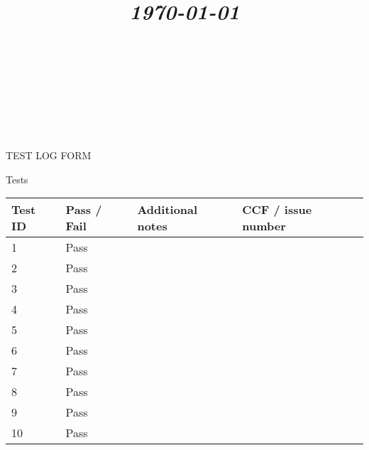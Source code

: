 \documentclass{article}
\title{
	\vspace{1.2in}
	\textmd{\textbf{\doctitle}} \\
	\vspace{0.1in}\large{\textit{\today}} \\
	\vspace{0.4in}
	{\bf{\qanumber}} \\ \vspace{0.4in} %
	\version \\
	\status \\
	\vspace{0.4in}
}
\author{\authors}
\date{}
\begin{document}
	\maketitle
	\newpage
	\tableofcontents
	\newpage

	\begin{section}{TEST LOG FORM}
		\begin{subsection}{Tests}
			\begin{tabularx}{\linewidth}{| p{1.5cm} | p{2cm} | p{9cm} | X |}
				\hline
				\bf{Test ID} & \bf{Pass / Fail} & \bf{Additional notes} & \bf{CCF / issue number} \\
				\hline
1
&
Pass
&

&

\\
\hline

2
&
Pass
&

&

\\
\hline 

3
&
Pass
&

&

\\
\hline

4
&
Pass
&

&

\\
\hline

5
&
Pass
&

&

\\
\hline

6
&
Pass
&

&

\\
\hline

7
&
Pass
&

&

\\
\hline

8
&
Pass
&

&

\\
\hline

9
&
Pass
&

&

\\
\hline

10
&
Pass
&

&

\\
\hline


\end{tabularx}
\end{subsection}
\end{section}
\end{document}
